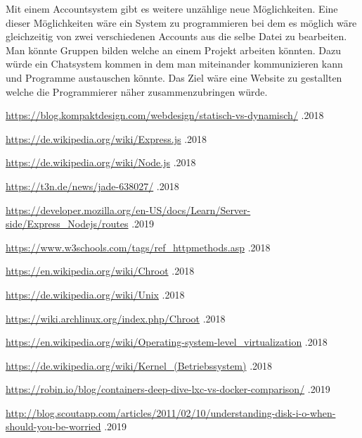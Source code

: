 \documentclass[10pt]{article}
\begin{document}
	Mit einem Accountsystem gibt es weitere unzählige neue Möglichkeiten. Eine dieser Möglichkeiten wäre ein System zu programmieren bei dem es möglich wäre gleichzeitig von zwei verschiedenen Accounts aus die selbe Datei zu bearbeiten. Man könnte Gruppen bilden welche an einem Projekt arbeiten könnten. Dazu würde ein Chatsystem kommen in dem man miteinander kommunizieren kann und Programme austauschen könnte. Das Ziel wäre eine Website zu gestallten welche die Programmierer näher zusammenzubringen würde.   
	 
	
	
	\pagebreak
	\listoffigures
	
	\printbibliography
	\begin{thebibliography}{999}
\url{https://blog.kompaktdesign.com/webdesign/statisch-vs-dynamisch/} .2018
 
\url{https://de.wikipedia.org/wiki/Express.js} .2018
 
\url{https://de.wikipedia.org/wiki/Node.js} .2018

\url{https://t3n.de/news/jade-638027/} .2018

\url{https://developer.mozilla.org/en-US/docs/Learn/Server-side/Express_Nodejs/routes} .2019

\url{https://www.w3schools.com/tags/ref_httpmethods.asp}%
 .2018
 
 \url{https://en.wikipedia.org/wiki/Chroot} .2018
 
 \url{https://de.wikipedia.org/wiki/Unix} .2018
 
 \url{https://wiki.archlinux.org/index.php/Chroot} .2018
 
 \url{https://en.wikipedia.org/wiki/Operating-system-level_virtualization} .2018
 
 \url{https://de.wikipedia.org/wiki/Kernel_(Betriebssystem)} .2018

	 \url{https://robin.io/blog/containers-deep-dive-lxc-vs-docker-comparison/} .2019
	 
	 \url{http://blog.scoutapp.com/articles/2011/02/10/understanding-disk-i-o-when-should-you-be-worried} .2019
	

\end{thebibliography}
\end{document}
